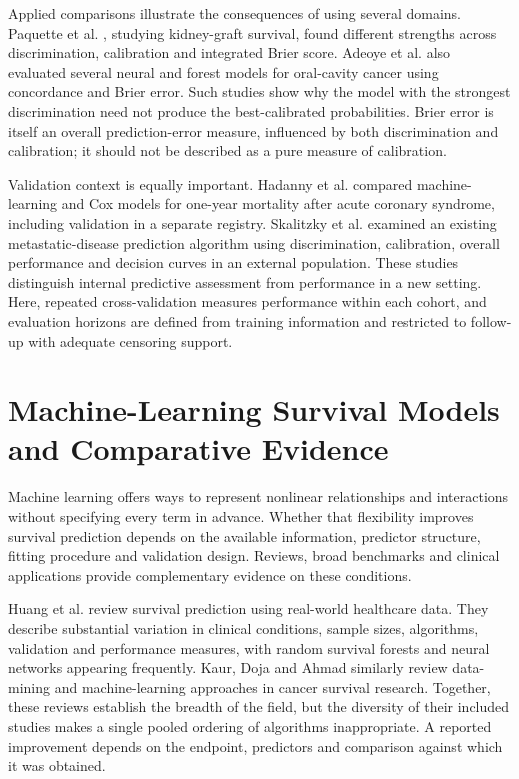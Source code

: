 Applied comparisons illustrate the consequences of using several domains. Paquette et al. \cite{ref66}, studying kidney-graft survival, found different strengths across discrimination, calibration and integrated Brier score. Adeoye et al. \cite{ref36} also evaluated several neural and forest models for oral-cavity cancer using concordance and Brier error. Such studies show why the model with the strongest discrimination need not produce the best-calibrated probabilities. Brier error is itself an overall prediction-error measure, influenced by both discrimination and calibration; it should not be described as a pure measure of calibration.

Validation context is equally important. Hadanny et al. \cite{ref41} compared machine-learning and Cox models for one-year mortality after acute coronary syndrome, including validation in a separate registry. Skalitzky et al. \cite{ref88} examined an existing metastatic-disease prediction algorithm using discrimination, calibration, overall performance and decision curves in an external population. These studies distinguish internal predictive assessment from performance in a new setting. Here, repeated cross-validation measures performance within each cohort, and evaluation horizons are defined from training information and restricted to follow-up with adequate censoring support.

\section{Machine-Learning Survival Models and Comparative Evidence}\label{machine-learning-survival-models-and-comparative-evidence}

Machine learning offers ways to represent nonlinear relationships and interactions without specifying every term in advance. Whether that flexibility improves survival prediction depends on the available information, predictor structure, fitting procedure and validation design. Reviews, broad benchmarks and clinical applications provide complementary evidence on these conditions.

Huang et al. \cite{ref1} review survival prediction using real-world healthcare data. They describe substantial variation in clinical conditions, sample sizes, algorithms, validation and performance measures, with random survival forests and neural networks appearing frequently. Kaur, Doja and Ahmad \cite{ref8} similarly review data-mining and machine-learning approaches in cancer survival research. Together, these reviews establish the breadth of the field, but the diversity of their included studies makes a single pooled ordering of algorithms inappropriate. A reported improvement depends on the endpoint, predictors and comparison against which it was obtained.

